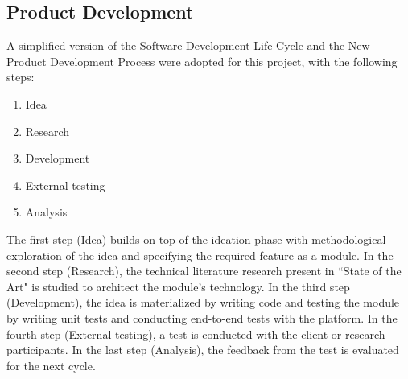 \documentclass{article}
\begin{document}
\subsection{Product Development}

A simplified version of the Software Development Life Cycle and the New Product Development Process were adopted for this project, with the following steps:

\begin{enumerate}
	\item Idea
	\item Research
	\item Development
	\item External testing
	\item Analysis
\end{enumerate}

The first step (Idea) builds on top of the ideation phase with methodological exploration of the idea and specifying the required feature as a module. In the second step (Research), the technical literature research present in ``State of the Art" is studied to architect the module's technology. In the third step (Development), the idea is materialized by writing code and testing the module by writing unit tests and conducting end-to-end tests with the platform. In the fourth step (External testing), a test is conducted with the client or research participants. In the last step (Analysis), the feedback from the test is evaluated for the next cycle.
\end{document}
